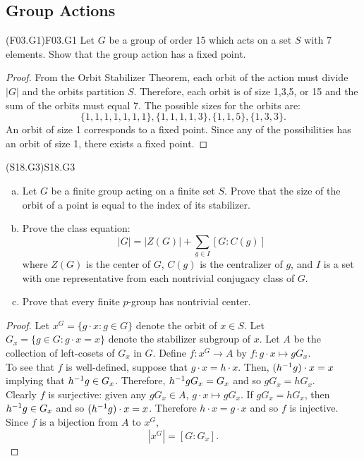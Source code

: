 \documentclass[../AlgebraQualSolutions.tex]{subfiles}
\begin{document}
\subsection{Group Actions}

\begin{prob}{(F03.G1)}{F03.G1}
    Let $G$ be a group of order 15 which acts on a set $S$ with 7 elements. Show that the group action has a fixed point.
\end{prob}

\begin{proof}
    From the Orbit Stabilizer Theorem, each orbit of the action must divide $|G|$ and the orbits partition $S$. Therefore, each orbit is of size 1,3,5, or 15 and the sum of the orbits must equal 7. The possible sizes for the orbits are:
        \[\{1,1,1,1,1,1,1\}, \{1,1,1,1,3\}, \{1,1,5\}, \{1,3,3\}.\]
    An orbit of size 1 corresponds to a fixed point. Since any of the possibilities has an orbit of size 1, there exists a fixed point.
\end{proof}

\begin{prob}{(S18.G3)}{S18.G3}
    \begin{enumerate}[(a)]
        \item Let $G$ be a finite group acting on a finite set $S$. Prove that the size of the orbit of a point is equal to the index  of its stabilizer.
        \item Prove  the class equation:
            \[|G| = |Z(G)| + \sum_{g \in I}[G: C(g)]\]
        where $Z(G)$ is the center of $G$, $C(g)$ is the centralizer of $g$, and $I$ is a set with one representative from each nontrivial conjugacy class of $G$.
        \item Prove  that every finite $p$-group has nontrivial center.
    \end{enumerate}
\end{prob}

\begin{proof}
    Let $x^G = \{g\cdot x: g \in G\}$ denote the orbit of $x \in S$. Let $G_x = \{g \in G: g\cdot x = x\}$ denote the stabilizer subgroup of $x$. Let $A$ be the collection of left-cosets of $G_x$ in $G$. Define $f: x^G \to A$ by $f: g\cdot x \mapsto gG_x$.\\

    To see that $f$ is well-defined, suppose that $g\cdot x = h \cdot x$. Then, $(h^{-1} g)\cdot x = x$ implying that $h^{-1} g \in G_x$. Therefore, $h^{-1} g G_x = G_x$ and so $gG_x = hG_x$.\\

    Clearly $f$ is surjective: given any $gG_x \in A$, $g\cdot x \mapsto gG_x$. If $gG_x = hG_x$, then $h^{-1} g \in G_x$ and so $(h^{-1} g) \cdot x = x$. Therefore $h\cdot x = g\cdot x$ and so $f$ is injective.\\

    Since $f$ is a bijection from $A$ to $x^G$,
        \[|x^G| = [G: G_x].\]
\end{proof}
\end{document}

